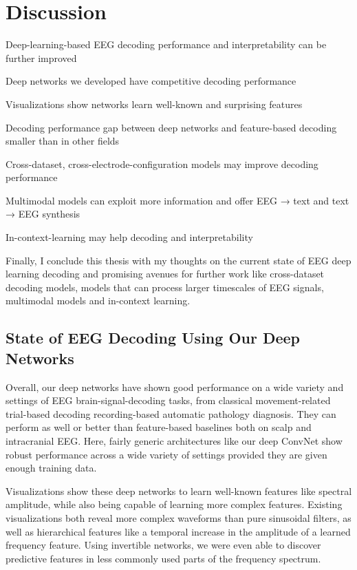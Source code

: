 \chapter{Discussion}

\begin{startbox}{Deep-learning-based EEG decoding performance and interpretability can be further improved}
\item Deep networks we developed have competitive decoding performance
\item Visualizations show networks learn well-known and surprising features
\item Decoding performance gap between deep networks and feature-based decoding smaller than in other fields
\item Cross-dataset, cross-electrode-configuration models may improve decoding performance
\item Multimodal models can exploit more information and offer EEG → text and text → EEG synthesis
\item In-context-learning may help decoding and interpretability
\end{startbox}


Finally, I conclude this thesis with my thoughts on the current state of
EEG deep learning decoding and promising avenues for further work like
cross-dataset decoding models, models that can process larger timescales
of EEG signals, multimodal models and in-context learning.

\section{State of EEG Decoding Using Our Deep
Networks}\label{state-of-eeg-decoding-using-our-deep-networks}

Overall, our deep networks have shown good performance on a wide variety
and settings of EEG brain-signal-decoding tasks, from classical
movement-related trial-based decoding recording-based automatic
pathology diagnosis. They can perform as well or better than
feature-based baselines both on scalp and intracranial EEG. Here, fairly
generic architectures like our deep ConvNet show robust performance
across a wide variety of settings provided they are given enough
training data.

Visualizations show these deep networks to learn well-known features
like spectral amplitude, while also being capable of learning more
complex features. Existing visualizations both reveal more complex
waveforms than pure sinusoidal filters, as well as hierarchical features
like a temporal increase in the amplitude of a learned frequency
feature. Using invertible networks, we were even able to discover
predictive features in less commonly used parts of the frequency
spectrum.

